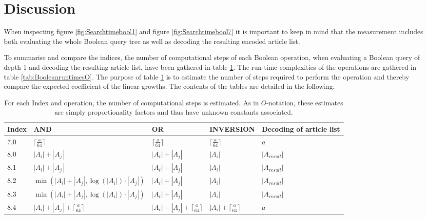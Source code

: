 \section{Discussion}\label{sec:bool_discussion}
When inspecting figure \ref{fig:Searchtimebool1} and figure \ref{fig:Searchtimebool7} it is important to keep in mind that the measurement includes both evaluating the whole Boolean query tree as well as decoding the resulting encoded article list. 

To summarise and compare the indices, the number of computational steps of each Boolean operation, when evaluating a Boolean query of depth 1 and decoding the resulting article list, have been gathered in table \ref{tab:Booleanruntimes1}. The run-time complexities of the operations are gathered in table \ref{tab:BooleanruntimesO}. The purpose of table \ref{tab:Booleanruntimes1} is to estimate the number of steps required to perform the operation and thereby compare the expected coefficient of the linear growths. The contents of the tables are detailed in the following. 


\begin{table}[H]
\begin{tabular}{l|lllp{2cm}}
    Index & AND & OR & INVERSION & Decoding of article list\\
\hline
7.0 &  $\lceil \frac{a}{64} \rceil$   &  $\lceil \frac{a}{64} \rceil$  &  $\lceil \frac{a}{64} \rceil$ & $a$         \\
8.0 &  $|A_i| + |A_j|$   &  $|A_i| +|A_j|$  &  $|A_i|$  & $|A_{result}|$       \\
8.1 &  $|A_i| + |A_j|$   &  $|A_i| + |A_j|$  &  $|A_i|$  & $|A_{result}|$         \\
8.2 &  $\min(|A_i| + |A_j|, \log(|A_i|)\cdot |A_j|)$   &  $|A_i| + |A_j|$  &  $|A_i|$  & $|A_{result}|$    \\
8.3 &  $\min(|A_i| + |A_j|, \log(|A_i|)\cdot |A_j|)$   &  $|A_i| + |A_j|$  &  $|A_i|$  & $|A_{result}|$     \\
8.4 &  $|A_i| + |A_j| + \lceil \frac{a}{64} \rceil$   &   $|A_i| + |A_j| + \lceil \frac{a}{64} \rceil$   &  $|A_i| + \lceil \frac{a}{64} \rceil$   & $a$
\end{tabular}
\caption{For each Index and operation, the number of computational steps is estimated. As in $O$-notation, these estimates are simply proportionality factors and thus have unknown constants associated. }
\label{tab:Booleanruntimes1}
\end{table}

